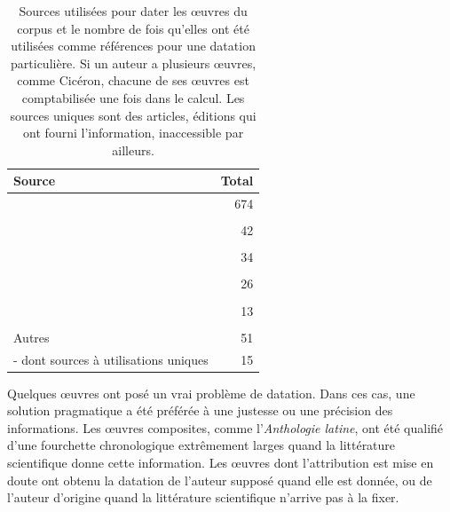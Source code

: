 \begin{table}[]
    \centering
    \begin{tabularx}{\textwidth}{X|r}
    \toprule
    Source & Total \\ \midrule
    \cite{zehnacker_litterature_2013} & 674 \\ 
    & \\
    \cite{noauthor_base_nodate} & 42 \\
    & \\
    \cite{lana_metodologie_2012} & 34 \\
    & \\
    \cite{buchwald_dictionnaire_1991} & 26 \\
    & \\
    \cite{hornblower_oxford_1996} &     13 \\
    & \\ \midrule
    Autres & 51 \\ 
    - dont sources à utilisations uniques & 15 \\\bottomrule
    \end{tabularx}
    \caption{Sources utilisées pour dater les œuvres du corpus et le nombre de fois qu'elles ont été utilisées comme références pour une datation particulière. Si un auteur a plusieurs œuvres, comme Cicéron, chacune de ses œuvres est comptabilisée une fois dans le calcul. Les sources uniques sont des articles, éditions qui ont fourni l'information, inaccessible par ailleurs.}
    \label{tab:chap1:sources-fredouilles}
\end{table}

Quelques œuvres ont posé un vrai problème de datation. Dans ces cas, une solution pragmatique a été préférée à une justesse ou une précision des informations. Les œuvres composites, comme l'\textit{Anthologie latine}, ont été qualifié d'une fourchette chronologique extrêmement larges quand la littérature scientifique donne cette information. Les œuvres dont l'attribution est mise en doute ont obtenu la datation de l'auteur supposé quand elle est donnée, ou de l'auteur d'origine quand la littérature scientifique n'arrive pas à la fixer.

